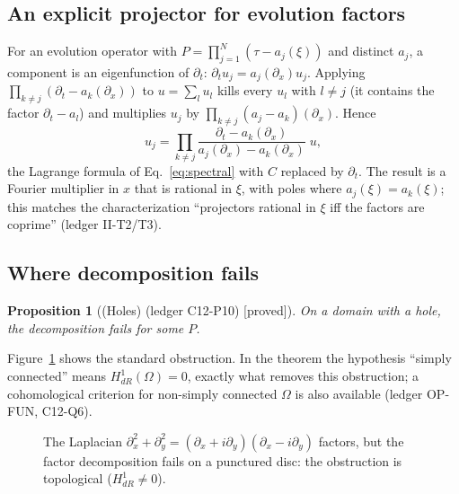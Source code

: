 \documentclass[11pt]{article}
\theoremstyle{plain}
\newtheorem{proposition}[theorem]{Proposition}
\theoremstyle{definition}
\theoremstyle{remark}
\newcommand{\badge}[2]{\textcolor{#1}{\textsf{\footnotesize[#2]}}}
\newcommand{\proved}[1][]{\badge{cC}{proved#1}}
\newcommand{\led}[1]{\textcolor{cG}{\textsf{\footnotesize(ledger #1)}}}
\begin{document}


\subsection{An explicit projector for evolution factors}
For an evolution operator with $P=\prod_{j=1}^N(\tau-a_j(\xi))$ and distinct $a_j$, a component is an eigenfunction of $\partial_t$: $\partial_tu_j=a_j(\partial_x)u_j$. Applying $\prod_{k\ne j}(\partial_t-a_k(\partial_x))$ to $u=\sum_lu_l$ kills every $u_l$ with $l\ne j$ (it contains the factor $\partial_t-a_l$) and multiplies $u_j$ by $\prod_{k\ne j}(a_j-a_k)(\partial_x)$. Hence
\begin{equation}\label{xeq:lagrange}
u_j=\prod_{k\ne j}\frac{\partial_t-a_k(\partial_x)}{a_j(\partial_x)-a_k(\partial_x)}\;u ,
\end{equation}
the Lagrange formula of Eq.~\eqref{eq:spectral} with $C$ replaced by $\partial_t$. The result is a Fourier multiplier in $x$ that is rational in $\xi$, with poles where $a_j(\xi)=a_k(\xi)$; this matches the characterization ``projectors rational in $\xi$ iff the factors are coprime'' \led{II-T2/T3}.

\subsection{Where decomposition fails}
\begin{proposition}[{(Holes) \led{C12-P10} \proved[]}]\label{prop:holes}
On a domain with a hole, the decomposition fails for some $P$.
\end{proposition}
Figure~\ref{fig:hole} shows the standard obstruction. In the theorem the hypothesis ``simply connected'' means $H^1_{dR}(\Omega)=0$, exactly what removes this obstruction; a cohomological criterion for non-simply connected $\Omega$ is also available \led{OP-FUN, C12-Q6}.
\begin{figure}[!htb]
\centering
{}
\caption{The Laplacian $\partial_x^2+\partial_y^2=(\partial_x+i\partial_y)(\partial_x-i\partial_y)$ factors, but the factor decomposition fails on a punctured disc: the obstruction is topological ($H^1_{dR}\neq0$).}\label{fig:hole}
\end{figure}
\end{document}
